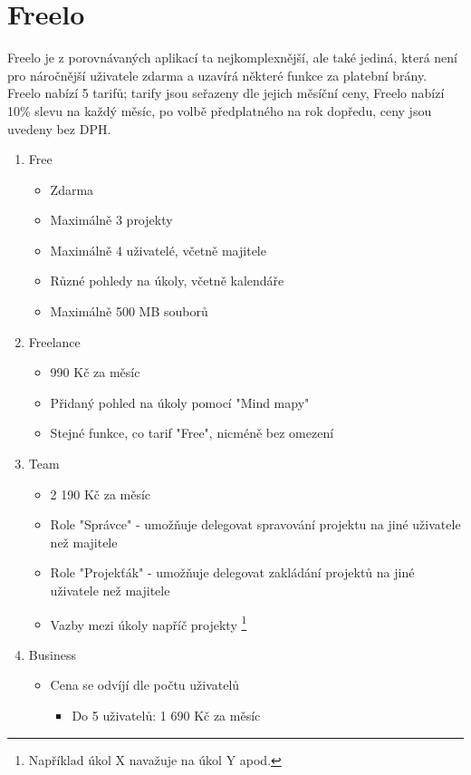 \section{Freelo}
Freelo je z porovnávaných aplikací ta nejkomplexnější, ale také jediná, která není pro náročnější uživatele zdarma a uzavírá některé funkce za platební brány. Freelo nabízí 5 tarifů; tarify jsou seřazeny dle jejich měsíční ceny, Freelo nabízí 10\% slevu na každý měsíc, po volbě předplatného na rok dopředu, ceny jsou uvedeny bez DPH\cite{freelo}.
\begin{enumerate}
	\item Free
	      \begin{itemize}
	      	\item Zdarma
	      	\item Maximálně 3 projekty
	      	\item Maximálně 4 uživatelé, včetně majitele
	      	\item Různé pohledy na úkoly, včetně kalendáře
	      	\item Maximálně 500 MB souborů
	      \end{itemize}
	\item Freelance
	      \begin{itemize}
	      	\item 990 Kč za měsíc
	      	\item Přidaný pohled na úkoly pomocí "Mind mapy"
	      	\item Stejné funkce, co tarif "Free", nicméně bez omezení
	      \end{itemize}
	\item Team
	      \begin{itemize}
	      	\item 2 190 Kč za měsíc
	      	\item Role "Správce" - umožňuje delegovat spravování projektu na jiné uživatele než majitele
	      	\item Role "Projekťák" - umožňuje delegovat zakládání projektů na jiné uživatele než majitele
	      	\item Vazby mezi úkoly napříč projekty \footnote{Například úkol X navažuje na úkol Y apod.}
	      \end{itemize}
	\item Business
	      \begin{itemize}
	      	\item Cena se odvíjí dle počtu uživatelů
	      	      \begin{itemize}
	      	      	\item Do 5 uživatelů: 1 690 Kč za měsíc

\end{itemize}
\end{itemize}
\end{enumerate}
